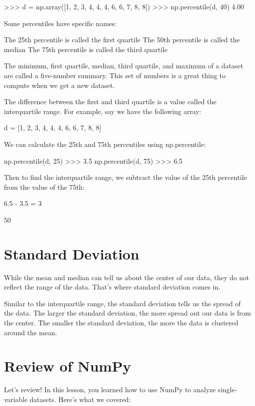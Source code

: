 \documentclass{journal}
\begin{document}
>>> d = np.array([1, 2, 3, 4, 4, 4, 6, 6, 7,  8, 8])
>>> np.percentile(d, 40)
4.00

Some percentiles have specific names:

    The 25th percentile is called the first quartile
    The 50th percentile is called the median
    The 75th percentile is called the third quartile

The minimum, first quartile, median, third quartile, and maximum of a dataset are called a five-number summary. This set of numbers is a great thing to compute when we get a new dataset.

The difference between the first and third quartile is a value called the interquartile range. For example, say we have the following array:

d = [1, 2, 3, 4, 4, 4, 6, 6, 7, 8, 8]

We can calculate the 25th and 75th percentiles using np.percentile:

np.percentile(d, 25)
>>> 3.5
np.percentile(d, 75)
>>> 6.5

Then to find the interquartile range, we subtract the value of the 25th percentile from the value of the 75th:

6.5 - 3.5 = 3

50%


\section{Standard Deviation}
While the mean and median can tell us about the center of our data, they do not reflect the range of the data. That's where standard deviation comes in.

Similar to the interquartile range, the standard deviation tells us the spread of the data. The larger the standard deviation, the more spread out our data is from the center. The smaller the standard deviation, the more the data is clustered around the mean.


\section{Review of NumPy}
Let's review! In this lesson, you learned how to use NumPy to analyze single-variable datasets. Here's what we covered:
\end{document}
